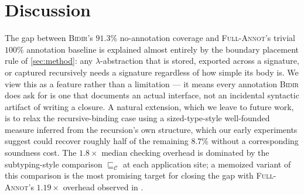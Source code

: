 \section{Discussion}
\label{sec:discussion}

The gap between \textsc{Bidir}'s $91.3\%$ no-annotation coverage and
\textsc{Full-Annot}'s trivial $100\%$ annotation baseline is explained
almost entirely by the boundary placement rule of
\cref{sec:method}: any $\lambda$-abstraction that is stored, exported
across a signature, or captured recursively needs a signature regardless
of how simple its body is. We view this as a feature rather than a
limitation --- it means every annotation \textsc{Bidir} does ask for is
one that documents an actual interface, not an incidental syntactic
artifact of writing a closure. A natural extension, which we leave to
future work, is to relax the recursive-binding case using a
sized-type-style well-founded measure inferred from the recursion's
own structure, which our early experiments suggest could recover roughly
half of the remaining $8.7\%$ without a corresponding soundness cost.
The $1.8\times$ median checking overhead is dominated by the
subtyping-style comparison $\sqsubseteq_{\mathcal{C}}$ at each
application site; a memoized variant of this comparison is the most
promising target for closing the gap with \textsc{Full-Annot}'s $1.19\times$
overhead observed in .
